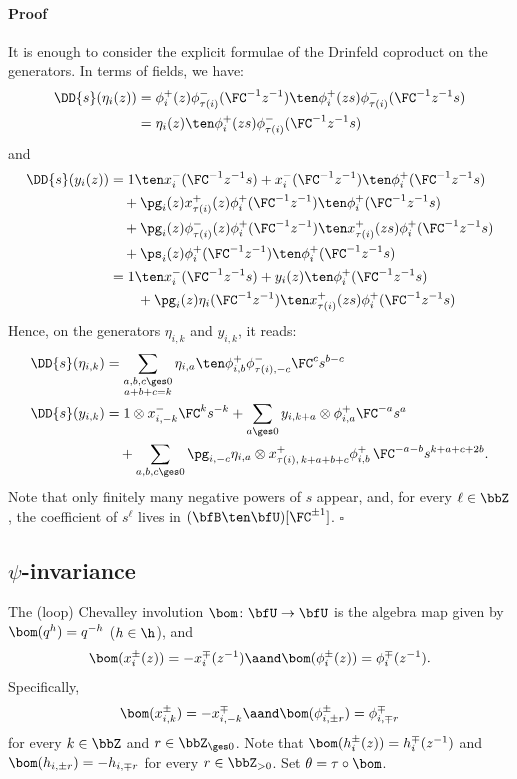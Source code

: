\documentclass[reqno]{amsart}
\numberwithin{equation}{section}
\newenvironment{pf}{\medskip\paragraph{{\sc Proof}}}{\hfill$\square$\par\medskip}
\begin{document}
\begin{pf}
	It is enough to consider the explicit formulae of the Drinfeld coproduct on the generators. In terms of fields, we have:
	\begin{align}\label{eq:DD-eta-field}
		\DD{s}(\eta_{i}(z))
		&=\phi_i^+(z)\phi_{\tau(i)}^-(\FC^{-1}z^{-1})\ten\phi_i^+(zs)\phi_{\tau(i)}^-(\FC^{-1}z^{-1}s)\\		
		&=\eta_{i}(z)\ten\phi_i^+(zs)\phi_{\tau(i)}^-(\FC^{-1}z^{-1}s)	
	\end{align}
	and
	\begin{align}\label{eq:DD-y-field}
		\DD{s}(y_{i}(z))&=
		1\ten x^{-}_i(\FC^{-1}z^{-1}s)
		+x^{-}_i(\FC^{-1}z^{-1})\ten\phi_i^+(\FC^{-1}z^{-1}s)\\
		&\quad+\pg_i(z)x_{\tau(i)}^+(z)\phi_i^+(\FC^{-1}z^{-1})\ten\phi^+_i(\FC^{-1}z^{-1}s)\\
		&\quad+\pg_i(z)\phi^-_{\tau(i)}(z)\phi_i^+(\FC^{-1}z^{-1})\ten x_{\tau(i)}^+(zs)\phi^+_i(\FC^{-1}z^{-1}s)\\
		&\quad+\ps_i(z)\phi^+_i(\FC^{-1}z^{-1})\ten\phi^+_i(\FC^{-1}z^{-1}s)\\
		&=1\ten x^{-}_i(\FC^{-1}z^{-1}s)+y_i(z)\ten\phi_i^+(\FC^{-1}z^{-1}s)\\
		&\qquad+\pg_i(z)\eta_i(\FC^{-1}z^{-1})\ten x_{\tau(i)}^+(zs)\phi^+_i(\FC^{-1}z^{-1}s)
	\end{align}
	Hence, on the generators $\eta_{i,k}$ and $y_{i,k}$, it reads: 
	\begin{align}
		\label{eq:DD-eta-gen}
		\DD{s}(\eta_{i,k})&=	\sum_{\substack{a,b,c\ges0\\a+b+c=k}}\eta_{i,a}\ten\phi^+_{i,b}\phi^-_{\tau(i),-c}\FC^{c}s^{b-c}\\
		\label{eq:DD-y-gen}
		\DD{s}(y_{i,k})&=
		1\otimes x^-_{i,-k}\FC^k s^{-k}
		+\sum_{a\ges 0}y_{i,k+a}\otimes \phi^+_{i,a}\FC^{-a}s^a\\
		&\quad+
		\sum_{a,b,c\ges 0}
		\pg_{i,-c}\eta_{i,a}\otimes x^+_{\tau(i),\,k+a+b+c}\phi^+_{i,b}
		\,\FC^{-a-b}s^{k+a+c+2b}.
	\end{align}
	Note that only finitely many negative powers of $s$ appear, and, for every $\ell\in\bbZ$, the coefficient of $s^{\ell}$ lives in $(\bfB\ten\bfU)[\FC^{\pm1}]$.
\end{pf}

\subsection{$\psi$-invariance}\label{ss:psi-invariance}
The (loop) Chevalley involution $\bom\colon\bfU\to\bfU$ is the algebra map given by
$\bom(q^h)=q^{-h}$ ($h\in\h$), and
\begin{equation}
	\bom(x^{\pm}_i(z))=-x^{\mp}_i(z^{-1})
	\aand
	\bom(\phi^{\pm}_i(z))=\phi^{\mp}_i(z^{-1}).
\end{equation}
Specifically, 
	\begin{equation}
	\bom(x^{\pm}_{i,k})=-x^{\mp}_{i,-k}
	\aand
	\bom(\phi^{\pm}_{i,\pm r})=\phi^{\mp}_{i,\mp r}
\end{equation}
for every $k\in\bbZ$ and $r\in\bbZ_{\ges0}$.
Note that $\bom(h^{\pm}_{i}(z))=h^{\mp}_{i}(z^{-1})$ and $\bom(h_{i,\pm r})=-h_{i,\mp r}$ for every $r\in\bbZ_{>0}$.
 Set $\theta=\tau\circ\bom$. 
\\
\end{document}
